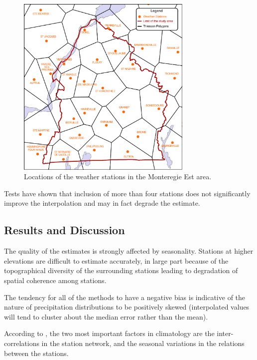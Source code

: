 \documentclass[ARTICLETHERMIC.tex]{subfiles}
\begin{document}
\begin{figure}
\centering
\includegraphics[width=0.75\textwidth]{img/Thiessen_meteo}
\caption[Locations of the weather stations in the Monteregie Est area.]{Locations of the weather stations in the Monteregie Est area.}
\label{fig:Thiessen_meteo}
\end{figure}


Tests have shown that inclusion of more than four stations does not significantly improve the interpolation and may in fact degrade the estimate. 

\subsection{Results and Discussion}

The quality of the estimates is strongly affected by seasonality. Stations at higher elevations are difficult to estimate accurately, in large part because of the topographical diversity of the surrounding stations leading to degradation of spatial coherence among stations.

The tendency for all of the methods to have a negative bias is indicative of the nature of precipitation distributions to be positively skewed (interpolated values will tend to cluster about the median error rather than the mean).

According to \cite{xia_forest_1999}, the two most important factors in climatology are the inter-correlations in the station network, and the seasonal variations in the relations between the stations.
\end{document}
